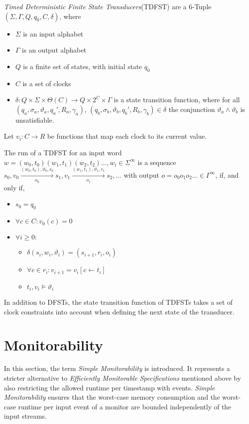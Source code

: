 		\begin{definition}
			\textit{Timed Deterministic Finite State Transducers}(TDFST) are a 6-Tuple $(\Sigma, \Gamma, Q, q_0, C, \delta)$, where
			\begin{itemize}
				\item
				$\Sigma$ is an input alphabet
				\item
				$\Gamma$ is an output alphabet
				\item
				$Q$ is a finite set of states, with initial state $q_0$
				\item
				$C$ is a set of clocks
				\item
				$\delta:Q\times\Sigma\times\Theta(C)\rightarrow Q\times 2^C\times\Gamma$ is a state transition function, where for all $(q_a, \sigma_a, \vartheta_a, q_a', R_a, \gamma_a)$, $(q_b, \sigma_b, \vartheta_b, q_b', R_b, \gamma_b)\in \delta$ the conjunction $\vartheta_a\land\vartheta_b$ is unsatisfiable. 
			\end{itemize}
			Let $v_i:C\rightarrow R$ be functions that map each clock to its current value.
			
			The run of a TDFST for an input word $w=(w_0,t_0)(w_1,t_1)(w_2,t_2)..., w_i\in\Sigma^\infty$ is a sequence $s_0, v_0\xrightarrow[o_0]{(w_0, t_0),\vartheta_0,r_0}s_1,v_1\xrightarrow[o_1]{(w_1, t_1),\vartheta_1,r_1}s_2,...$ with output $o=o_0o_1o_2...\in \Gamma^\infty$, if, and only if, 
			\begin{itemize}
				\item
					$s_0=q_0$
				\item
					$\forall c\in C: v_0(c)=0$
				\item
					$\forall i\geq 0:$
					\begin{itemize}
						\item
							$\delta(s_i, w_i,\vartheta_i)=(s_{i+1},r_i,o_i)$
						\item
							$\forall c\in r_i: v_{i+1}=v_i[c\leftarrow t_i]$
						\item
							$t_i,v_i \models\vartheta_i$
					\end{itemize}
			\end{itemize}
		\end{definition}
		In addition to DFSTs, the state transition function of TDFSTs takes a set of clock constraints into account when defining the next state of the transducer.
	
\section{Monitorability}
	\label{sec:monitorability}
	In this section, the term \textit{Simple Monitorability} is introduced. It represents a stricter alternative to \textit{Efficiently Monitorable Specifications} mentioned above by also restricting the allowed runtime per timestamp with events. \textit{Simple Monitorability} ensures that the worst-case memory consumption and the worst-case runtime per input event of a monitor are bounded independently of the input streams. 
